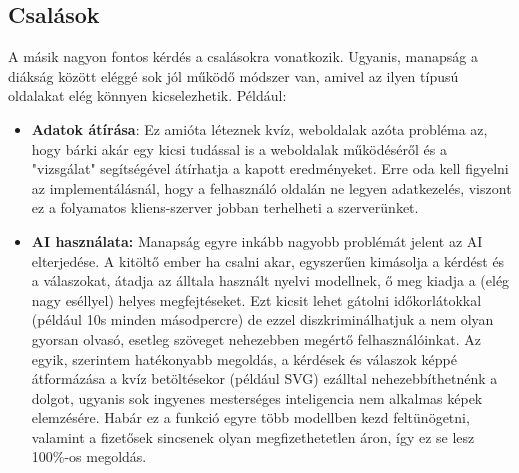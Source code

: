 \documentclass[a4paper,12pt]{article}
\begin{document}
\subsection{Csalások}
A másik nagyon fontos kérdés a csalásokra vonatkozik. Ugyanis, manapság a diákság között eléggé sok jól működő módszer van, amivel az ilyen típusú oldalakat elég könnyen kicselezhetik. Például:
\begin{itemize}
	\item\textbf{Adatok átírása}: Ez amióta léteznek kvíz, weboldalak azóta probléma az, hogy bárki akár egy kicsi tudással is a weboldalak működéséről és a "vizsgálat" segítségével átírhatja a kapott eredményeket. Erre oda kell figyelni az implementálásnál, hogy a felhasználó oldalán ne legyen adatkezelés, viszont ez a folyamatos kliens-szerver jobban terhelheti a szerverünket.
	\item\textbf{AI használata:} Manapság egyre inkább nagyobb problémát jelent az AI elterjedése. A kitöltő ember ha csalni akar, egyszerűen kimásolja a kérdést és a válaszokat, átadja az álltala használt nyelvi modellnek, ő meg kiadja a (elég nagy eséllyel) helyes megfejtéseket. Ezt kicsit lehet gátolni időkorlátokkal (például 10s minden másodpercre) de ezzel diszkriminálhatjuk a nem olyan gyorsan olvasó, esetleg szöveget nehezebben megértő felhasználóinkat. Az egyik, szerintem hatékonyabb megoldás, a kérdések és válaszok képpé átformázása a kvíz betöltésekor (például SVG) ezálltal nehezebbíthetnénk a dolgot, ugyanis sok ingyenes mesterséges inteligencia nem alkalmas képek elemzésére. Habár ez a funkció egyre több modellben kezd feltünögetni, valamint a fizetősek sincsenek olyan megfizethetetlen áron, így ez se lesz 100\%-os megoldás.
\end{itemize}



\end{document}
